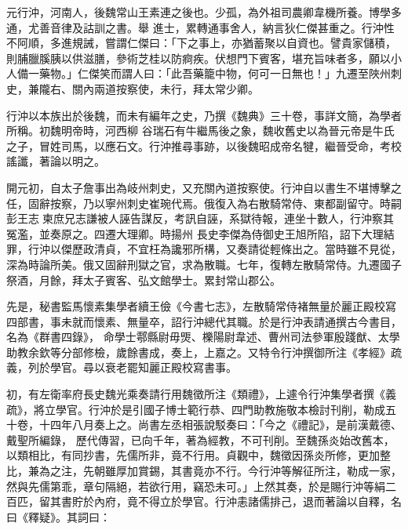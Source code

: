 \begin{pinyinscope}
 元行沖，河南人，後魏常山王素連之後也。少孤，為外祖司農卿韋機所養。博學多通，尤善音律及詁訓之書。舉
 進士，累轉通事舍人，納言狄仁傑甚重之。行沖性不阿順，多進規誡，嘗謂仁傑曰：「下之事上，亦猶蓄聚以自資也。譬貴家儲積，則脯臘膎胰以供滋膳，參術芝桂以防痾疾。伏想門下賓客，堪充旨味者多，願以小人備一藥物。」仁傑笑而謂人曰：「此吾藥籠中物，何可一日無也！」九遷至陜州刺史，兼隴右、關內兩道按察使，未行，拜太常少卿。



 行沖以本族出於後魏，而未有編年之史，乃撰《魏典》三十卷，事詳文簡，為學者所稱。初魏明帝時，河西柳
 谷瑞石有牛繼馬後之象，魏收舊史以為晉元帝是牛氏之子，冒姓司馬，以應石文。行沖推尋事跡，以後魏昭成帝名犍，繼晉受命，考校謠讖，著論以明之。



 開元初，自太子詹事出為岐州刺史，又充關內道按察使。行沖自以書生不堪博擊之任，固辭按察，乃以寧州刺史崔琬代焉。俄復入為右散騎常侍、東都副留守。時嗣彭王志柬庶兄志謙被人誣告謀反，考訊自誣，系獄待報，連坐十數人，行沖察其冤濫，並奏原之。四遷大理卿。時揚州
 長史李傑為侍御史王旭所陷，詔下大理結罪，行沖以傑歷政清貞，不宜枉為讒邪所構，又奏請從輕條出之。當時雖不見從，深為時論所美。俄又固辭刑獄之官，求為散職。七年，復轉左散騎常侍。九遷國子祭酒，月餘，拜太子賓客、弘文館學士。累封常山郡公。



 先是，秘書監馬懷素集學者續王儉《今書七志》，左散騎常侍褚無量於麗正殿校寫四部書，事未就而懷素、無量卒，詔行沖總代其職。於是行沖表請通撰古今書目，名為《群書四錄》，
 命學士鄠縣尉毋煚、櫟陽尉韋述、曹州司法參軍殷踐猷、太學助教余欽等分部修檢，歲餘書成，奏上，上嘉之。又特令行沖撰御所注《孝經》疏義，列於學官。尋以衰老罷知麗正殿校寫書事。



 初，有左衛率府長史魏光乘奏請行用魏徵所注《類禮》，上遽令行沖集學者撰《義疏》，將立學官。行沖於是引國子博士範行恭、四門助教施敬本檢討刊削，勒成五十卷，十四年八月奏上之。尚書左丞相張說駁奏曰：「今之《禮記》，是前漢戴德、戴聖所編錄，
 歷代傳習，已向千年，著為經教，不可刊削。至魏孫炎始改舊本，以類相比，有同抄書，先儒所非，竟不行用。貞觀中，魏徵因孫炎所修，更加整比，兼為之注，先朝雖厚加賞錫，其書竟亦不行。今行沖等解征所注，勒成一家，然與先儒第乖，章句隔絕，若欲行用，竊恐未可。」上然其奏，於是賜行沖等絹二百匹，留其書貯於內府，竟不得立於學官。行沖恚諸儒排己，退而著論以自釋，名曰《釋疑》。其詞曰：




\end{pinyinscope}
